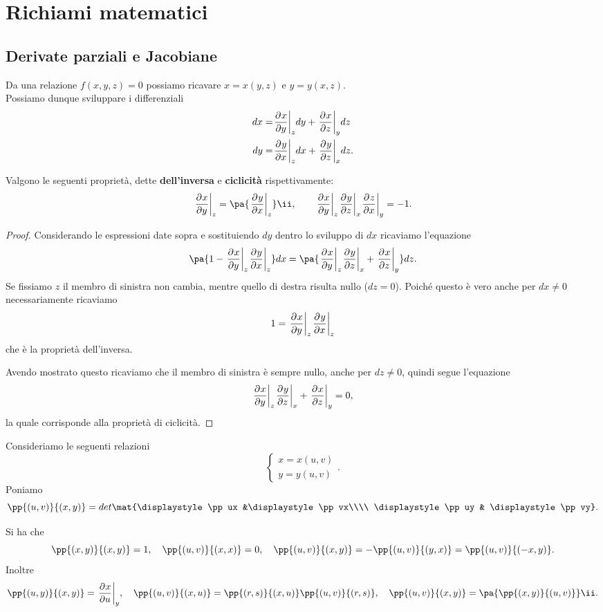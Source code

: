 \chapter{Richiami matematici}
\section{Derivate parziali e Jacobiane}
Da una relazione $f(x,y,z)=0$ possiamo ricavare $x=x(y,z)$ e $y=y(x,z)$.\\
Possiamo dunque sviluppare i differenziali
\begin{align*}
dx=&\ppb yxzdy+\ppb zxydz\\
dy=&\ppb xyzdx+\ppb zyxdz.
\end{align*}

\begin{proposition}\label{ProprietaDerivateParziali}
Valgono le seguenti propriet\`a, dette \textbf{dell'inversa} e \textbf{ciclicit\`a} rispettivamente:
\[\ppb yxz=\pa{\ppb xyz}\ii,\qquad \ppb yxz\ppb zyx\ppb xzy=-1.\]
\end{proposition}
\begin{proof}
Considerando le espressioni date sopra e sostituiendo $dy$ dentro lo sviluppo di $dx$ ricaviamo l'equazione
\[\pa{1-\ppb yxz\ppb xyz}dx=\pa{\ppb yxz\ppb zyx+\ppb zxy}dz.\]
Se fissiamo $z$ il membro di sinistra non cambia, mentre quello di destra risulta nullo ($dz=0$). Poich\'e questo \`e vero anche per $dx\neq 0$ necessariamente ricaviamo
\[1=\ppb yxz\ppb xyz\]
che \`e la propriet\`a dell'inversa.\medskip

\noindent Avendo mostrato questo ricaviamo che il membro di sinistra \`e sempre nullo, anche per $dz\neq 0$, quindi segue l'equazione
\[\ppb yxz\ppb zyx+\ppb zxy=0,\]
la quale corrisponde alla propriet\`a di ciclicit\`a.
\end{proof}

\noindent Consideriamo le seguenti relazioni
\[\begin{cases}
x=x(u,v)\\
y=y(u,v)
\end{cases}.\]
Poniamo
\[\pp{(u,v)}{(x,y)}=det{\mat{\displaystyle\pp ux &\displaystyle\pp vx\\\\ \displaystyle\pp uy & \displaystyle\pp vy}}.\]
\begin{remark}\label{JacobianeNotevoli}
Si ha che
\[\pp{(x,y)}{(x,y)}=1,\quad \pp{(u,v)}{(x,x)}=0,\quad \pp{(u,v)}{(x,y)}=-\pp{(u,v)}{(y,x)}=\pp{(u,v)}{(-x,y)}.\]
Inoltre
\[\pp{(u,y)}{(x,y)}=\ppb uxy,\quad \pp{(u,v)}{(x,u)}=\pp{(r,s)}{(x,u)}\pp{(u,v)}{(r,s)},\quad \pp{(u,v)}{(x,y)}=\pa{\pp{(x,y)}{(u,v)}}\ii.\]
\end{remark}


